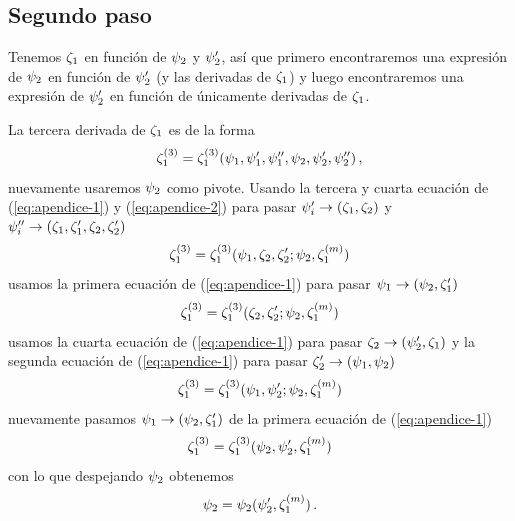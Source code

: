 \documentclass[%
 aip,
 jmp,%
 amsmath,amssymb,
 reprint,%
]{revtex4-2}
\begin{document}
{\subsection{Segundo paso}
Tenemos $\zeta_1$ en función de $\psi_2$ y $\psi_2'$, así que primero encontraremos una expresión de $\psi_2$ en función de $\psi_2'$ (y las derivadas de $\zeta_1$) y luego encontraremos una expresión de $\psi_2'$ en función de únicamente derivadas de $\zeta_1$.

La tercera derivada de $\zeta_1$ es de la forma
\begin{equation}
    \zeta_1^{(3)}=\zeta_1^{(3)}(\psi_1,\psi_1',\psi_1'',\psi_2,\psi_2',\psi_2'')\,,
\end{equation}
nuevamente usaremos $\psi_2$ como pivote. Usando la tercera y cuarta ecuación de (\ref{eq:apendice-1}) y (\ref{eq:apendice-2}) para pasar $\psi_i'\rightarrow (\zeta_1,\zeta_2)$ y $\psi_i''\rightarrow (\zeta_1,\zeta_1',\zeta_2,\zeta_2')$
\begin{equation}
     \zeta_1^{(3)}=\zeta_1^{(3)}(\psi_1,\zeta_2,\zeta_2';\psi_2,\zeta_1^{(m)})
\end{equation}
usamos la primera ecuación de (\ref{eq:apendice-1}) para pasar $\psi_1\rightarrow (\psi_2,\zeta_1')$
\begin{equation}
     \zeta_1^{(3)}=\zeta_1^{(3)}(\zeta_2,\zeta_2';\psi_2,\zeta_1^{(m)})
\end{equation}
usamos la cuarta ecuación de (\ref{eq:apendice-1}) para pasar $\zeta_2\rightarrow (\psi_2',\zeta_1)$ y la segunda ecuación de (\ref{eq:apendice-1}) para pasar $\zeta_2'\rightarrow (\psi_1,\psi_2)$
\begin{equation}
     \zeta_1^{(3)}=\zeta_1^{(3)}(\psi_1,\psi_2';\psi_2,\zeta_1^{(m)})
\end{equation}
nuevamente pasamos $\psi_1\rightarrow (\psi_2,\zeta_1')$ de la primera ecuación de (\ref{eq:apendice-1})
\begin{equation}
     \zeta_1^{(3)}=\zeta_1^{(3)}(\psi_2,\psi_2',\zeta_1^{(m)})
\end{equation}
con lo que despejando $\psi_2$ obtenemos
\begin{equation}\label{eq:p_2-despejada}
    \psi_2=\psi_2(\psi_2',\zeta_1^{(m)})\,.
\end{equation}

}
\end{document}
